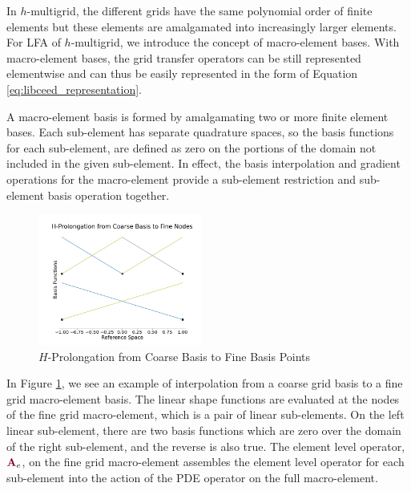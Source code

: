 In $h$-multigrid, the different grids have the same polynomial order of finite elements but these elements are amalgamated into increasingly larger elements.
For LFA of $h$-multigrid, we introduce the concept of macro-element bases.
With macro-element bases, the grid transfer operators can be still represented elementwise and can thus be easily represented in the form of Equation \ref{eq:libceed_representation}.

A macro-element basis is formed by amalgamating two or more finite element bases.
Each sub-element has separate quadrature spaces, so the basis functions for each sub-element, are defined as zero on the portions of the domain not included in the given sub-element.
In effect, the basis interpolation and gradient operations for the macro-element provide a sub-element restriction and sub-element basis operation together.

\begin{figure}[!ht]
  \centering
  \includegraphics[width=0.48\textwidth]{../img/hProlongation}
  \caption{$H$-Prolongation from Coarse Basis to Fine Basis Points}
  \label{fig:h_prolongation}
\end{figure}

In Figure \ref{fig:h_prolongation}, we see an example of interpolation from a coarse grid basis to a fine grid macro-element basis.
The linear shape functions are evaluated at the nodes of the fine grid macro-element, which is a pair of linear sub-elements.
On the left linear sub-element, there are two basis functions which are zero over the domain of the right sub-element, and the reverse is also true.
The element level operator, ${\color{burgundy}\mathbf{A}}_e$, on the fine grid macro-element assembles the element level operator for each sub-element into the action of the PDE operator on the full macro-element.

